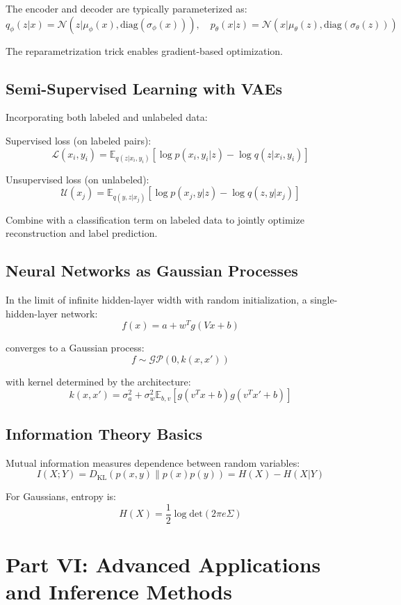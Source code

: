 \documentclass[12pt,a4paper]{article}
\theoremstyle{definition}
\begin{document}
The encoder and decoder are typically parameterized as:
\[
q_\phi(z|x) = \mathcal{N}(z | \mu_\phi(x), \mathrm{diag}(\sigma_\phi(x))), \quad p_\theta(x|z) = \mathcal{N}(x | \mu_\theta(z), \mathrm{diag}(\sigma_\theta(z)))
\]

The reparametrization trick enables gradient-based optimization.

\subsection{Semi-Supervised Learning with VAEs}

Incorporating both labeled and unlabeled data:

Supervised loss (on labeled pairs):
\[
\mathcal{L}(x_i, y_i) = \mathbb{E}_{q(z|x_i, y_i)}[\log p(x_i, y_i|z) - \log q(z|x_i, y_i)]
\]

Unsupervised loss (on unlabeled):
\[
\mathcal{U}(x_j) = \mathbb{E}_{q(y,z|x_j)}[\log p(x_j, y|z) - \log q(z, y|x_j)]
\]

Combine with a classification term on labeled data to jointly optimize reconstruction and label prediction.

\subsection{Neural Networks as Gaussian Processes}

In the limit of infinite hidden-layer width with random initialization, a single-hidden-layer network:
\[
f(x) = a + w^T g(Vx + b)
\]

converges to a Gaussian process:
\[
f \sim \mathcal{GP}(0, k(x, x'))
\]

with kernel determined by the architecture:
\[
k(x, x') = \sigma_a^2 + \sigma_w^2 \mathbb{E}_{b,v}[g(v^T x + b) g(v^T x' + b)]
\]

\subsection{Information Theory Basics}

Mutual information measures dependence between random variables:
\[
I(X; Y) = D_{\mathrm{KL}}(p(x,y) \| p(x)p(y)) = H(X) - H(X|Y)
\]

For Gaussians, entropy is:
\[
H(X) = \frac{1}{2}\log \mathrm{det}(2\pi e \Sigma)
\]

\newpage

\section{Part VI: Advanced Applications and Inference Methods}
\end{document}
